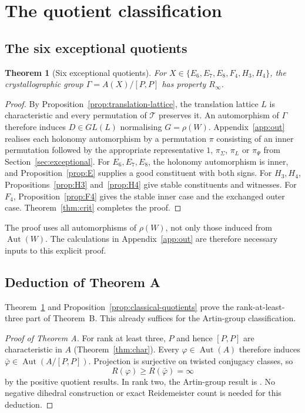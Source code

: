 \documentclass[11pt]{amsart}
\newtheorem{theorem}{Theorem}[section]
\theoremstyle{definition}
\newcommand{\T}{\mathcal{T}}
\newcommand{\Aut}{\operatorname{Aut}}
\newcommand{\Rinf}{R_\infty}
\begin{document}
\section{The quotient classification}\label{sec:quotients}

\subsection{The six exceptional quotients}

\begin{theorem}[Six exceptional quotients]\label{cor:cryst}
For $X\in\{E_6,E_7,E_8,F_4,H_3,H_4\}$, the crystallographic group $\Gamma=A(X)/[P,P]$ has property $\Rinf$.
\end{theorem}

\begin{proof}
By Proposition~\ref{prop:translation-lattice}, the translation lattice $L$ is characteristic
and every permutation of $\T$ preserves it. An automorphism of $\Gamma$ therefore induces
$D\in GL(L)$ normalising $G=\rho(W)$.
Appendix~\ref{app:out} realises each holonomy automorphism by a permutation $\pi$ consisting of an inner permutation followed by
the appropriate representative $1$, $\pi_\Sigma$, $\pi_L$ or $\pi_\Psi$ from Section~\ref{sec:exceptional}.
For $E_6,E_7,E_8$, the holonomy automorphism is inner,
and Proposition~\ref{prop:E} supplies a good constituent with both signs.
For $H_3,H_4$, Propositions~\ref{prop:H3} and~\ref{prop:H4} give stable constituents and witnesses.
For $F_4$, Proposition~\ref{prop:F4} gives the stable inner case and the exchanged outer case.
Theorem~\ref{thm:crit} completes the proof.
\end{proof}

The proof uses all automorphisms of $\rho(W)$, not only those induced from $\Aut(W)$.
The calculations in Appendix~\ref{app:out} are therefore necessary inputs to this explicit proof.

\subsection{Deduction of Theorem A}

Theorem~\ref{cor:cryst} and Proposition~\ref{prop:classical-quotients} prove the rank-at-least-three
part of Theorem~B. This already suffices for the Artin-group classification.

\begin{proof}[Proof of Theorem A]
For rank at least three, $P$ and hence $[P,P]$ are characteristic in $A$
(Theorem~\ref{thm:char}). Every $\varphi\in\Aut(A)$ therefore induces
$\bar\varphi\in\Aut(A/[P,P])$. Projection is surjective on twisted conjugacy classes, so
\[
R(\varphi)\ge R(\bar\varphi)=\infty
\]
by the positive quotient results. In rank two, the Artin-group result is
\cite[Thm.~1]{CS22}. No negative dihedral construction or exact Reidemeister count is needed
for this deduction.
\end{proof}
\end{document}

